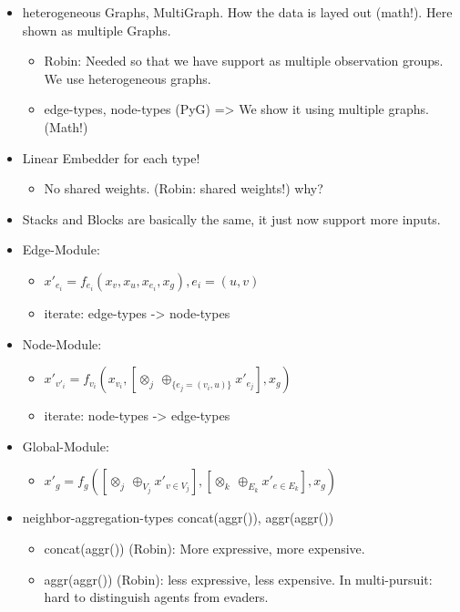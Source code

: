 \begin{itemize}[noitemsep,nolistsep]
    \item heterogeneous Graphs, MultiGraph. How the data is layed out (math!). Here shown as multiple Graphs.
    \begin{itemize}[noitemsep,nolistsep]
        \item Robin: Needed so that we have support as multiple observation groups. We use heterogeneous graphs.
        \item edge-types, node-types (PyG) => We show it using multiple graphs. (Math!)
    \end{itemize}
    \item Linear Embedder for each type!
    \begin{itemize}[noitemsep,nolistsep]
        \item No shared weights. (Robin: shared weights!) why?
    \end{itemize}
    \item Stacks and Blocks are basically the same, it just now support more inputs.
    \item Edge-Module:
    \begin{itemize}[noitemsep,nolistsep]
        \item $x'_{e_i} = f_{e_i}(x_v, x_u, x_{e_i}, x_g), e_i = (u, v)$
        \item iterate: edge-types -> node-types
    \end{itemize}
    \item Node-Module:
    \begin{itemize}[noitemsep,nolistsep]
        \item $x'_{v'_i} = f_{v_i}(x_{v_i}, [\otimes_j\ \oplus_{\{e_j=(v_i,u)\}} x'_{e_j}], x_g)$
        \item iterate: node-types -> edge-types
    \end{itemize}
    \item Global-Module:
    \begin{itemize}[noitemsep,nolistsep]
        \item $x'_{g} = f_g([\otimes_j\ \oplus_{V_j} x'_{v\in V_j}], [\otimes_k\ \oplus_{E_k} x'_{e\in E_k}], x_g)$
    \end{itemize}
    \item neighbor-aggregation-types concat(aggr()), aggr(aggr())
    \begin{itemize}[noitemsep,nolistsep]
        \item concat(aggr()) (Robin): More expressive, more expensive.
        \item aggr(aggr()) (Robin): less expressive, less expensive. In multi-pursuit: hard to distinguish agents from evaders.
    \end{itemize}
\end{itemize}

